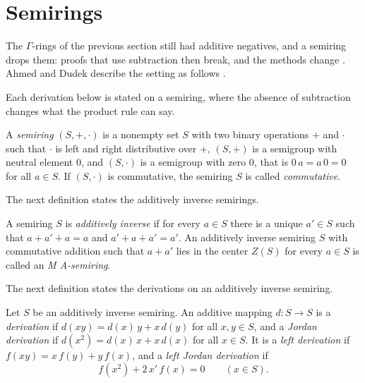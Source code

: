 \section{Semirings}\label{sec:other-systems:semirings}

The $\Gamma$-rings of the previous section still had additive negatives,
and a semiring drops them: proofs that use subtraction then break, and
the methods change \cite[p.~624]{AhmedDudek2021}. Ahmed and Dudek
describe the setting as follows
\cite[p.~625]{AhmedDudek2021}.

Each derivation below is stated on a semiring, where the absence of subtraction changes what the product rule can say.

\begin{definition}\label{def:other:semiring}
A \emph{semiring} $(S, +, \cdot)$ is a nonempty set $S$ with two binary
operations $+$ and $\cdot$ such that $\cdot$ is left and right
distributive over $+$, $(S, +)$ is a semigroup with neutral element $0$,
and $(S, \cdot)$ is a semigroup with zero $0$, that is $0\,a = a\,0 = 0$
for all $a \in S$. If $(S, \cdot)$ is commutative, the semiring $S$ is
called \emph{commutative}.
\end{definition}

The next definition states the additively inverse semirings.

\begin{definition}\label{def:other:ma-semiring}
A semiring $S$ is \emph{additively inverse} if for every $a \in S$ there
is a unique $a' \in S$ such that $a + a' + a = a$ and $a' + a + a' = a'$.
An additively inverse semiring $S$ with commutative addition such that
$a + a'$ lies in the center $Z(S)$ for every $a \in S$ is called an
\emph{M A-semiring}.
\end{definition}

The next definition states the derivations on an additively inverse semiring.

\begin{definition}\label{def:other:semiring-derivations}
Let $S$ be an additively inverse semiring. An additive mapping
$d \colon S \to S$ is a \emph{derivation} if
$d(xy) = d(x)\,y + x\,d(y)$ for all $x, y \in S$, and a \emph{Jordan
derivation} if $d(x^{2}) = d(x)\,x + x\,d(x)$ for all $x \in S$. It is a
\emph{left derivation} if $f(xy) = x\,f(y) + y\,f(x)$, and a \emph{left
Jordan derivation} if
\[
f(x^{2}) + 2\,x'\,f(x) = 0 \qquad (x \in S).
\]
\end{definition}

